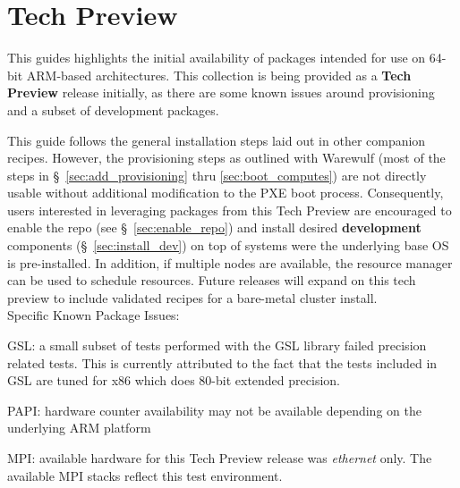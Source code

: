 \section{Tech Preview}

This guides highlights the initial availability of \OHPC{} packages intended
for use on 64-bit ARM-based architectures. This collection is being provided as
a {\bf Tech Preview} release initially, as there are some known issues around
provisioning and a subset of development packages.

This guide follows the general installation steps laid out in other companion
\OHPC{} recipes.  However, the provisioning steps as outlined with Warewulf
(most of the steps in \S~\ref{sec:add_provisioning} thru
\ref{sec:boot_computes}) are not directly usable without additional
modification to the PXE boot process.  Consequently, users interested in
leveraging packages from this Tech Preview are encouraged to enable the repo
(see \S~\ref{sec:enable_repo}) and install desired {\bf development}
components (\S~\ref{sec:install_dev}) on top of systems were the underlying
base OS is pre-installed. In addition, if multiple nodes are available, the
\rms{} resource manager can be used to schedule resources. Future \OHPC{} releases
will expand on this tech preview to include validated recipes for a bare-metal
cluster install. \\

\noindent Specific Known Package Issues: 
\begin{itemize*}
\item GSL: a small subset of tests performed with the GSL library failed
  precision related tests. This is currently attributed to the fact that the
  tests included in GSL are tuned for x86 which does 80-bit extended precision.
  \item PAPI: hardware counter availability may not be available depending on
    the underlying ARM platform
  \item MPI: available hardware for this Tech Preview release was {\em
    ethernet} only. The available MPI stacks reflect this test environment.
\end{itemize*}

